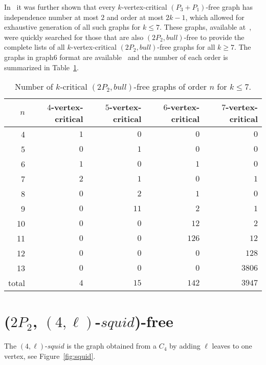 \documentclass[11pt]{article}
\theoremstyle{definition}
\newcommand{\squid}[1]{$(4,#1)$-$squid$}
\begin{document}
In~\cite{CameronHoangSawada2022} it was further shown that every $k$-vertex-critical $(P_3+P_1)$-free graph has independence number at most $2$ and order at most $2k-1$, which allowed for exhaustive generation of all such graphs for $k\le 7$. These graphs, available at~\cite{graphfiles}, were quickly searched for those that are also $(2P_2,bull)$-free to provide the complete lists of all $k$-vertex-critical $(2P_2,bull)$-free graphs for all $k\ge 7$.  The graphs in graph6 format are available~\cite{2P2bullfreefiles} and the number of each order is summarized in Table~\ref{tab:5to72P2bullcrit}.

\begin{table}[!h]
\begin{center}  \small
\renewcommand\arraystretch{1.2}
\begin{tabular}{|r|r|r|r|r|} 
\hline
$n$  &  $4$-vertex-critical  & $5$-vertex-critical & $6$-vertex-critical & $7$-vertex-critical  \\ \hline
%
4   	& $1$  & $0$      &  $0$     & $0$ \\ \hline
5   	& $0$  & $1$      &  $0$     & $0$ \\ \hline
6  		& $1$  & $0$   	  &  $1$     & $0$ \\ \hline
7   	& $2$  & $1$   	  &  $0$     & $1$ \\ \hline
8   	& $0$  & $2$   	  &  $1$     & $0$ \\ \hline
9   	& $0$  & $11$ 	  &  $2$     & $1$  \\ \hline
10  	& $0$  & $0$   	  &  $12$    & $2$    \\ \hline
11  	& $0$  & $0$   	  &  $126$   & $12$ \\ \hline 
12  	& $0$  & $0$   	  &  $0$  	 & $128$ \\ \hline
13  	& $0$  & $0$   	  &  $0$  	 & $3806$ \\ \hline \hline
total 	& $4$  & $15$ 	  & $142$ 	 & $3947$ \\ \hline
\end{tabular}
\caption{Number of $k$-critical $(2P_2,bull)$-free graphs of order $n$ for $k\le 7$.}\label{tab:5to72P2bullcrit}
\end{center}
\end{table}


\section{($2P_2$, \squid{\ell})-free}\label{sec:ellsquid}
The \squid{\ell}  is the graph obtained from a $C_4$ by adding $\ell$ leaves to one vertex, see Figure~\ref{fig:squid}.
\end{document}
